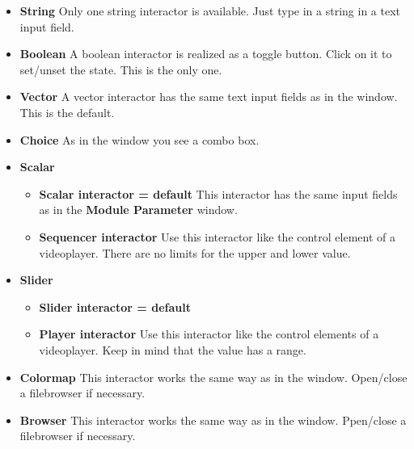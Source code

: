 	 \begin{itemize}
	 \item {\bf String}
	 Only one string interactor is available. Just type in a string in a text input field.

	 \item {\bf Boolean}
	 A boolean interactor is realized as a toggle button. Click on it to set/unset the state.
	 This is the only one.

	 \item {\bf Vector}
	 A vector interactor has the same text input fields as in the {\myparameter} window. This is the default.	

	 \item  {\bf Choice}
	 As in the {\myparameter} window you see a combo box.  

	 \item {\bf Scalar}

	 \begin{itemize}
    
 			\item {\bf Scalar interactor = default}	This interactor has the same input fields as in the
			{\bf Module Parameter} window.

 			\item {\bf Sequencer interactor}	 Use this interactor like the control element of a
			videoplayer. There are no limits for the upper and lower value.
         
	 \end{itemize}	
    
	 \item {\bf Slider}
    
	 \begin{itemize}
 			\item {\bf Slider interactor = default}	

 			\item {\bf Player interactor}	Use this interactor like the control elements of a
			videoplayer. Keep in mind that the value has a range.		
         
	 \end{itemize}		
		
	 \item  {\bf Colormap}
	 This interactor works the same way as in the {\myparameter} window. Open/close a 
	 filebrowser if necessary.

	 \item  {\bf Browser}
	 This interactor works the same way as in the {\myparameter} window. Ppen/close a 
	 filebrowser if necessary.
     
	 \end{itemize}






